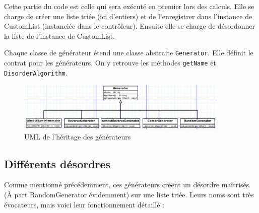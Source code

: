 \documentclass[a4paper,12pt]{article}
\begin{document}
Cette partie du code est celle qui sera exécuté en premier lors des calculs. Elle se charge de créer une liste triée (ici d'entiers) et de l'enregistrer dans l'instance de CustomList (instanciée dans le contrôleur). Ensuite elle se charge de désordonner la liste de l'instance de CustomList.

Chaque classe de générateur étend une classe abstraite \texttt{Generator}. Elle définit le contrat pour les générateurs. On y retrouve les méthodes \texttt{getName} et \texttt{DisorderAlgorithm}.
\vspace{1cm}
\begin{figure}[h]
    \centering
    \includegraphics[width=0.9\textwidth]{uml_generator.png}
    \caption{UML de l'héritage des générateurs}
    \label{UML generator}
\end{figure}

\newpage
\subsection{Différents désordres}
Comme mentionné précédemment, ces générateurs créent un désordre maîtrisés (À part RandomGenerator évidemment) sur une liste triée. Leurs noms sont très évocateurs, mais voici leur fonctionnement détaillé :
\vspace{0.5cm}
\end{document}
